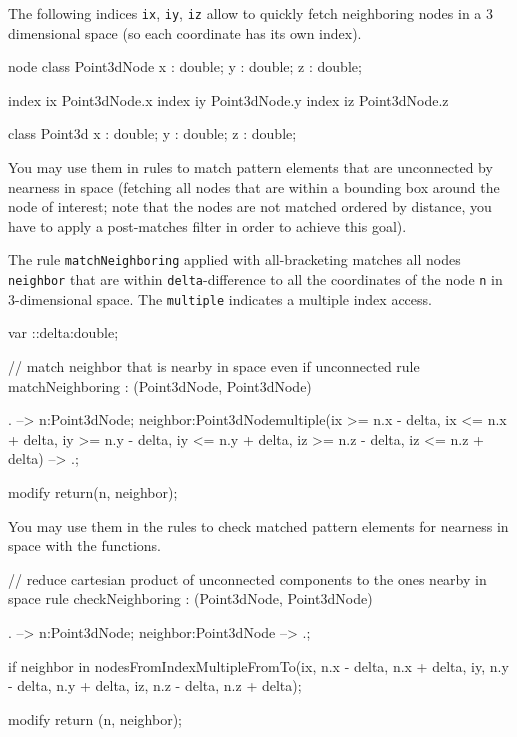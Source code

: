 \begin{example}\label{ex:spatialquery}
The following indices \texttt{ix}, \texttt{iy}, \texttt{iz} allow to quickly fetch neighboring nodes in a 3 dimensional space (so each coordinate has its own index).

\begin{grgen}
node class Point3dNode {
  x : double;
  y : double;
  z : double;
}

index ix { Point3dNode.x }
index iy { Point3dNode.y }
index iz { Point3dNode.z }

class Point3d {
  x : double;
  y : double;
  z : double;
}
\end{grgen}

You may use them in rules to match pattern elements that are unconnected by nearness in space (fetching all nodes that are within a bounding box around the node of interest; note that the nodes are not matched ordered by distance, you have to apply a post-matches filter in order to achieve this goal).

The rule \texttt{matchNeighboring} applied with all-bracketing matches all nodes \texttt{neighbor} that are within
\texttt{delta}-difference to all the coordinates of the node \texttt{n} in $3$-dimensional space.
The \texttt{multiple} indicates a multiple index access.

\begin{grgen}
var ::delta:double;

// match neighbor that is nearby in space even if unconnected
rule matchNeighboring : (Point3dNode, Point3dNode) {
  . --> n:Point3dNode;
  neighbor:Point3dNode{multiple(ix >= n.x - delta, ix <= n.x + delta, iy >= n.y - delta, iy <= n.y + delta, iz >= n.z - delta, iz <= n.z + delta)} --> .;

  modify {
    return(n, neighbor);
  }
}
\end{grgen}

You may use them in the rules to check matched pattern elements for nearness in space with the functions.

\begin{grgen}
// reduce cartesian product of unconnected components to the ones nearby in space
rule checkNeighboring : (Point3dNode, Point3dNode) {
  . --> n:Point3dNode;
  neighbor:Point3dNode --> .;

  if {
    neighbor in nodesFromIndexMultipleFromTo(ix, n.x - delta, n.x + delta, iy, n.y - delta, n.y + delta, iz, n.z - delta, n.z + delta);
  }

  modify {
    return (n, neighbor);
  }
}
\end{grgen}

\end{example}


